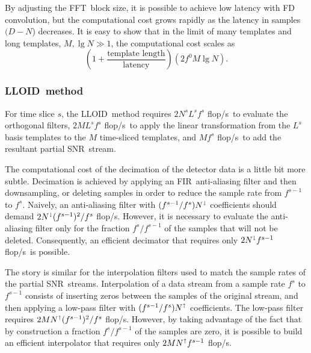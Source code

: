 \documentclass[preprint2]{aastex}
\newcommand{\SNR}{SNR}%
\newcommand{\numtmps}{\ensuremath{M}}
\newcommand{\svdtmps}[1]{\ensuremath{L^#1}}
\newcommand{\numsvdtmps}{\svdtmps{s}}
\newcommand{\slicesamps}[1]{\ensuremath{N^#1}}
\newcommand{\slicessamps}{\slicesamps{s}}
\newcommand{\fir}{FIR}%
\newcommand{\fft}{FFT}%
\newcommand{\flops}{flop/s}
\newcommand{\lloid}{LLOID}%
\begin{document}
By adjusting the \fft\ block size, it is possible to achieve low latency with FD
convolution, but the computational cost grows rapidly as the latency in samples
$(D-N$) decreases.  It is easy to show that in the limit of many templates and
long templates, $M, \lg N \gg 1$, the computational cost scales as
%
$$
\left(1 + \frac{\textrm{template length}}{\textrm{latency}}\right) \left( 2 f^0 M \lg N \right).
$$

\subsubsection{\label{sec:lloid-method}\lloid\ method}

For time slice $s$, the \lloid\ method requires $2 \slicessamps \numsvdtmps f^s$ \flops\ 
to evaluate the orthogonal filters, $2 \numtmps \numsvdtmps f^s$ \flops\ to
apply the  linear transformation from the $\numsvdtmps$ basis templates to the
$\numtmps$ time-sliced templates, and $\numtmps f^s$ \flops\ to add the
resultant partial \SNR\ stream.

The computational cost of the decimation of the detector data is a little bit
more subtle.  Decimation is achieved by applying an \fir\ anti-aliasing filter
and then downsampling, or deleting samples in order to reduce the sample rate
from $f^{s-1}$ to $f^s$.  Naively, an anti-aliasing filter with
$(f^{s-1} / f^s) N^\shortdownarrow$ coefficients should demand
$2 N^\shortdownarrow (f^{s-1})^2 / f^s$ \flops.  However, it is necessary to
evaluate the anti-aliasing filter only for the fraction $f^s / f^{s-1}$ of the
samples that will not be deleted.  Consequently, an efficient decimator that
requires only $2 N^\shortdownarrow f^{s-1}$ \flops\ is possible.

The story is similar for the interpolation filters used to match the sample
rates of the partial \SNR\ streams.  Interpolation of a data stream from a
sample rate $f^s$ to $f^{s-1}$ consists of inserting zeros between the samples
of the original stream, and then applying a low-pass filter with
$(f^{s-1} / f^s) N^\shortuparrow$ coefficients.  The low-pass filter requires
$2 M N^\shortuparrow (f^{s-1})^2 / f^s$ \flops.  However, by taking advantage
of the fact that by construction a fraction $f^s / f^{s-1}$ of the samples are
zero, it is possible to build an efficient interpolator that requires only
$2 M N^\shortuparrow f^{s-1}$ \flops.
\end{document}
